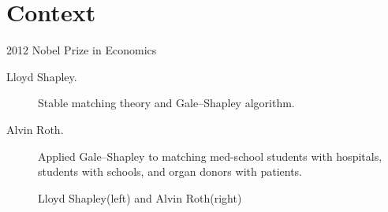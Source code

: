 \documentclass{beamer}
\begin{document}











\section{Context}
\begin{frame} 
	\tableofcontents[currentsection]
\end{frame}

\begin{frame}{2012 Nobel Prize in Economics}
	\begin{description}
		\item [Lloyd Shapley.] Stable matching theory and Gale–Shapley algorithm.
	\end{description}
	\begin{figure}
	\end{figure} 
	\begin{description}
		\item [Alvin Roth.] Applied Gale–Shapley to matching med-school students with
		hospitals, students with schools, and organ donors with patients.
	\end{description}
	\begin{figure}
		\caption{Lloyd Shapley(left) and Alvin Roth(right)}
	\end{figure} 
\end{frame}
	
\end{document}
